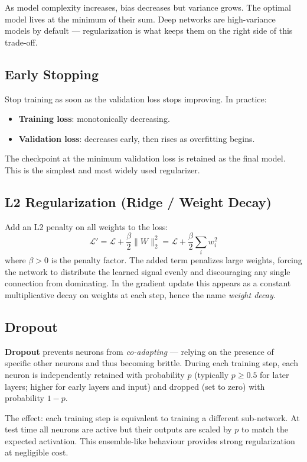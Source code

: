 \documentclass[11pt,a4paper]{article}
\theoremstyle{definition}
\theoremstyle{plain}
\theoremstyle{remark}
\begin{document}
As model complexity increases, bias decreases but variance grows. The optimal model lives at the minimum of their sum. Deep networks are high-variance models by default --- regularization is what keeps them on the right side of this trade-off.

\subsection{Early Stopping}

Stop training as soon as the validation loss stops improving. In practice:
\begin{itemize}
    \item \textbf{Training loss}: monotonically decreasing.
    \item \textbf{Validation loss}: decreases early, then rises as overfitting begins.
\end{itemize}
The checkpoint at the minimum validation loss is retained as the final model. This is the simplest and most widely used regularizer.

\subsection{L2 Regularization (Ridge / Weight Decay)}

Add an L2 penalty on all weights to the loss:
\[
    \mathcal{L}' = \mathcal{L} + \frac{\beta}{2}\|W\|_2^2 = \mathcal{L} + \frac{\beta}{2}\sum_i w_i^2
\]
where $\beta > 0$ is the penalty factor. The added term penalizes large weights, forcing the network to distribute the learned signal evenly and discouraging any single connection from dominating. In the gradient update this appears as a constant multiplicative decay on weights at each step, hence the name \emph{weight decay}.

\subsection{Dropout}

\textbf{Dropout} prevents neurons from \emph{co-adapting} --- relying on the presence of specific other neurons and thus becoming brittle. During each training step, each neuron is independently retained with probability $p$ (typically $p \geq 0.5$ for later layers; higher for early layers and input) and dropped (set to zero) with probability $1-p$.

The effect: each training step is equivalent to training a different sub-network. At test time all neurons are active but their outputs are scaled by $p$ to match the expected activation. This ensemble-like behaviour provides strong regularization at negligible cost.
\end{document}
